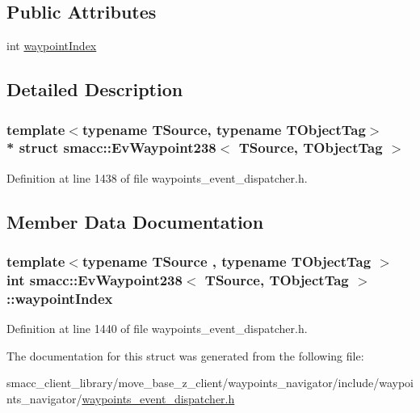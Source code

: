 \subsection*{Public Attributes}
\begin{DoxyCompactItemize}
\item 
int \hyperlink{structsmacc_1_1EvWaypoint238_a2a136b661977782b2f7a552246a4887e}{waypoint\+Index}
\end{DoxyCompactItemize}


\subsection{Detailed Description}
\subsubsection*{template$<$typename T\+Source, typename T\+Object\+Tag$>$\\*
struct smacc\+::\+Ev\+Waypoint238$<$ T\+Source, T\+Object\+Tag $>$}



Definition at line 1438 of file waypoints\+\_\+event\+\_\+dispatcher.\+h.



\subsection{Member Data Documentation}
\subsubsection[{\texorpdfstring{waypoint\+Index}{waypointIndex}}]{\setlength{\rightskip}{0pt plus 5cm}template$<$typename T\+Source , typename T\+Object\+Tag $>$ int {\bf smacc\+::\+Ev\+Waypoint238}$<$ T\+Source, T\+Object\+Tag $>$\+::waypoint\+Index}\hypertarget{structsmacc_1_1EvWaypoint238_a2a136b661977782b2f7a552246a4887e}{}\label{structsmacc_1_1EvWaypoint238_a2a136b661977782b2f7a552246a4887e}


Definition at line 1440 of file waypoints\+\_\+event\+\_\+dispatcher.\+h.



The documentation for this struct was generated from the following file\+:\begin{DoxyCompactItemize}
\item 
smacc\+\_\+client\+\_\+library/move\+\_\+base\+\_\+z\+\_\+client/waypoints\+\_\+navigator/include/waypoints\+\_\+navigator/\hyperlink{waypoints__event__dispatcher_8h}{waypoints\+\_\+event\+\_\+dispatcher.\+h}\end{DoxyCompactItemize}
